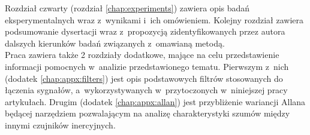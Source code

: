 Rozdział czwarty (rozdział \ref{chap:experiments}) zawiera opis badań eksperymentalnych wraz z~wynikami i~ich omówieniem. Kolejny rozdział zawiera podsumowanie dysertacji wraz z~propozycją zidentyfikowanych przez autora dalszych kierunków badań związanych z~omawianą metodą.\\

Praca zawiera także 2 rozdziały dodatkowe, mające na celu przedstawienie informacji pomocnych w~analizie przedstawionego tematu. Pierwszym z~nich (dodatek \ref{chap:appx:filters}) jest opis podstawowych filtrów stosowanych do łączenia sygnałów, a~wykorzystywanych w~przytoczonych w~niniejszej pracy artykułach. Drugim (dodatek \ref{chap:appx:allan}) jest przybliżenie wariancji Allana będącej narzędziem pozwalającym na analizę charakterystyki szumów między innymi czujników inercyjnych.